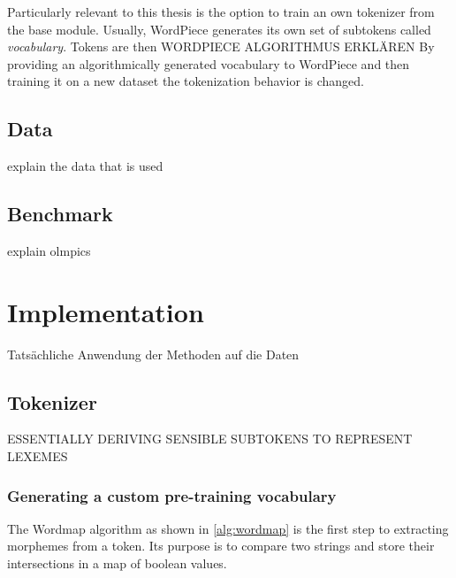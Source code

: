 Particularly relevant to this thesis is the option to train an own tokenizer from the base module.
Usually, WordPiece generates its own set of subtokens called \textit{vocabulary}.
Tokens are then \uppercase{WORDPIECE algorithmus erklären}
By providing an algorithmically generated vocabulary to WordPiece and then training it on a new dataset the tokenization behavior is changed.




\subsection{Data}
\label{subsec:data}
explain the data that is used

\subsection{Benchmark}
\label{subsec:benchmark}
explain olmpics

\section{Implementation}
\label{sec:implementation}

Tatsächliche Anwendung der Methoden auf die Daten

\subsection{Tokenizer}
\label{subsec:tokenizer}
\uppercase{essentially deriving sensible subtokens to represent lexemes}

\subsubsection{Generating a custom pre-training vocabulary}
\label{subsubsec:generating-a-custom-pre-training-vocabulary}

The Wordmap algorithm as shown in \autoref{alg:wordmap} is the first step to extracting morphemes from a token.
Its purpose is to compare two strings and store their intersections in a map of boolean values.


